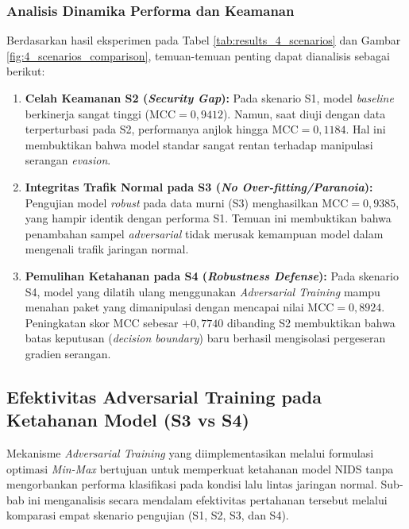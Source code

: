 \documentclass[11pt, a4paper]{article}
\begin{document}
\subsubsection{Analisis Dinamika Performa dan Keamanan}
Berdasarkan hasil eksperimen pada Tabel \ref{tab:results_4_scenarios} dan Gambar \ref{fig:4_scenarios_comparison}, temuan-temuan penting dapat dianalisis sebagai berikut:
\begin{enumerate}
    \item \textbf{Celah Keamanan S2 (\textit{Security Gap}):} Pada skenario S1, model \textit{baseline} berkinerja sangat tinggi ($\text{MCC} = 0,9412$). Namun, saat diuji dengan data terperturbasi pada S2, performanya anjlok hingga $\text{MCC} = 0,1184$. Hal ini membuktikan bahwa model standar sangat rentan terhadap manipulasi serangan \textit{evasion}.
    
    \item \textbf{Integritas Trafik Normal pada S3 (\textit{No Over-fitting/Paranoia}):} Pengujian model \textit{robust} pada data murni (S3) menghasilkan $\text{MCC} = 0,9385$, yang hampir identik dengan performa S1. Temuan ini membuktikan bahwa penambahan sampel \textit{adversarial} tidak merusak kemampuan model dalam mengenali trafik jaringan normal.

    \item \textbf{Pemulihan Ketahanan pada S4 (\textit{Robustness Defense}):} Pada skenario S4, model yang dilatih ulang menggunakan \textit{Adversarial Training} mampu menahan paket yang dimanipulasi dengan mencapai nilai $\text{MCC} = 0,8924$. Peningkatan skor MCC sebesar $+0,7740$ dibanding S2 membuktikan bahwa batas keputusan (\textit{decision boundary}) baru berhasil mengisolasi pergeseran gradien serangan.
\end{enumerate}


\subsection{Efektivitas Adversarial Training pada Ketahanan Model (S3 vs S4)}
Mekanisme \textit{Adversarial Training} yang diimplementasikan melalui formulasi optimasi \textit{Min-Max} bertujuan untuk memperkuat ketahanan model NIDS tanpa mengorbankan performa klasifikasi pada kondisi lalu lintas jaringan normal. Sub-bab ini menganalisis secara mendalam efektivitas pertahanan tersebut melalui komparasi empat skenario pengujian (S1, S2, S3, dan S4).
\end{document}
